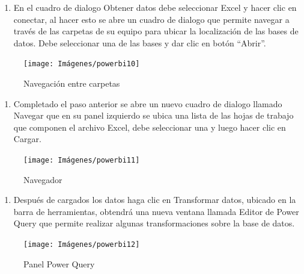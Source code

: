 \documentclass[
]{book}
\providecommand{\tightlist}{%
  \setlength{\itemsep}{0pt}\setlength{\parskip}{0pt}}
\begin{document}
\begin{enumerate}
\def\labelenumi{\arabic{enumi}.}
\setcounter{enumi}{1}
\tightlist
\item
  En el cuadro de dialogo Obtener datos debe seleccionar Excel y hacer clic en conectar, al hacer esto se abre un cuadro de dialogo que permite navegar a través de las carpetas de su equipo para ubicar la localización de las bases de datos. Debe seleccionar una de las bases y dar clic en botón ``Abrir''.
\end{enumerate}

\begin{figure}

{\centering \texttt{[image: Imágenes/powerbi10]} 

}

\caption{Navegación entre carpetas}\label{fig:conexiondatos2-fig}
\end{figure}

\begin{enumerate}
\def\labelenumi{\arabic{enumi}.}
\setcounter{enumi}{2}
\tightlist
\item
  Completado el paso anterior se abre un nuevo cuadro de dialogo llamado Navegar que en su panel izquierdo se ubica una lista de las hojas de trabajo que componen el archivo Excel, debe seleccionar una y luego hacer clic en Cargar.
\end{enumerate}

\begin{figure}

{\centering \texttt{[image: Imágenes/powerbi11]} 

}

\caption{Navegador}\label{fig:conexiondatos3-fig}
\end{figure}

\begin{enumerate}
\def\labelenumi{\arabic{enumi}.}
\setcounter{enumi}{3}
\tightlist
\item
  Después de cargados los datos haga clic en Transformar datos, ubicado en la barra de herramientas, obtendrá una nueva ventana llamada Editor de Power Query que permite realizar algunas transformaciones sobre la base de datos.
\end{enumerate}

\begin{figure}

{\centering \texttt{[image: Imágenes/powerbi12]} 

}

\caption{Panel Power Query}\label{fig:conexiondatos4-fig}
\end{figure}
\end{document}
